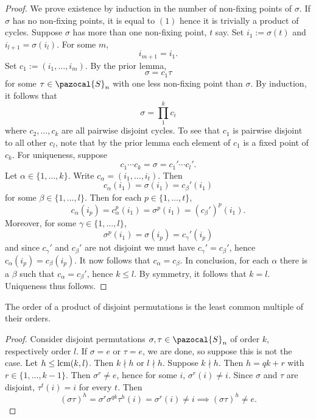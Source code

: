 \begin{proof}
    We prove existence by induction in the number of non-fixing points of $\sigma$. If $\sigma$ has no non-fixing points, it is equal to $(1)$ hence it is trivially a product of cycles. Suppose $\sigma$ has more than one non-fixing point, $t$ say. Set $i_1 := \sigma(t)$ and $i_{l+1}=\sigma(i_l)$. For some $m$, 
    $$
        i_{m+1}=i_1.
    $$   
    Set $c_1 := (i_1,\dots,i_m)$. By the prior lemma, 
    $$
        \sigma = c_1\tau
    $$
    for some $\tau\in \pazocal{S}_n$ with one less non-fixing point than $\sigma$. By induction, it follows that 
    $$
        \sigma = \prod_1^k c_i
    $$
    where $c_2,\dots,c_k$ are all pairwise disjoint cycles. To see that $c_1$ is pairwise disjoint to all other $c_l$, note that by the prior lemma each element of $c_1$ is a fixed point of $c_k$. For uniqueness, suppose  
    $$
        c_1\cdots c_k = \sigma = c_1'\cdots c_l'.
    $$
    Let $\alpha\in \{1,\dots,k\}$. Write $c_\alpha = (i_1,\dots,i_t)$. Then 
    $$
        c_\alpha(i_1)= \sigma(i_1) = c_\beta'(i_1)
    $$
    for some $\beta\in \{1,\dots,l\}$. Then for each $p\in \{1,\dots,t\}$, 
    $$
        c_\alpha(i_p) = c_\alpha^p(i_1) = \sigma^p(i_1)=\left(c_\beta'\right)^p(i_1). 
    $$
    Moreover, for some $\gamma\in \{1,\dots,l\}$,
    $$
        \sigma^p(i_1) = \sigma(i_p) = c_\gamma'(i_p)
    $$
    and since $c_\gamma'$ and $c_\beta'$ are not disjoint we must have $c_\gamma'=c_\beta'$, hence 
    $c_\alpha(i_p)=c_\beta(i_p)$. It now follows that $c_\alpha=c_\beta$. In conclusion, for each $\alpha$ there is a $\beta$ such that $c_\alpha = c_\beta'$, hence $k\leq l$. By symmetry, it follows that $k=l$. Uniqueness thus follows. 
\end{proof}
\begin{lemma}
    The order of a product of disjoint permutations is the least common multiple of their orders. 
\end{lemma}
\begin{proof}
    Consider disjoint permutations $\sigma,\tau\in \pazocal{S}_n$ of order $k$, respectively order $l$. If $\sigma =e$ or $\tau=e$, we are done, so suppose this is not the case. Let $h\leq \mathrm{lcm}(k,l)$. Then $k\nmid h$ or $l\nmid h$. Suppose $k\nmid h$. Then $h=qk +r $ with $r\in \{1,\dots,k-1\}$. Then $\sigma^r\neq e$, hence for some $i$, $\sigma^r(i)\neq i$. Since $\sigma$ and $\tau$ are disjoint, $\tau^t(i)=i$ for every $t$. Then 
    $$
        (\sigma\tau)^h=\sigma^r\sigma^{qk}\tau^h(i)=\sigma^r(i)\neq i \implies (\sigma\tau)^h\neq e.
    $$
\end{proof}
